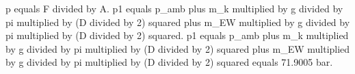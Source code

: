p equals F divided by A.  
p1 equals p_amb plus m_k multiplied by g divided by pi multiplied by (D divided by 2) squared plus m_EW multiplied by g divided by pi multiplied by (D divided by 2) squared.  
p1 equals p_amb plus m_k multiplied by g divided by pi multiplied by (D divided by 2) squared plus m_EW multiplied by g divided by pi multiplied by (D divided by 2) squared equals 71.9005 bar.